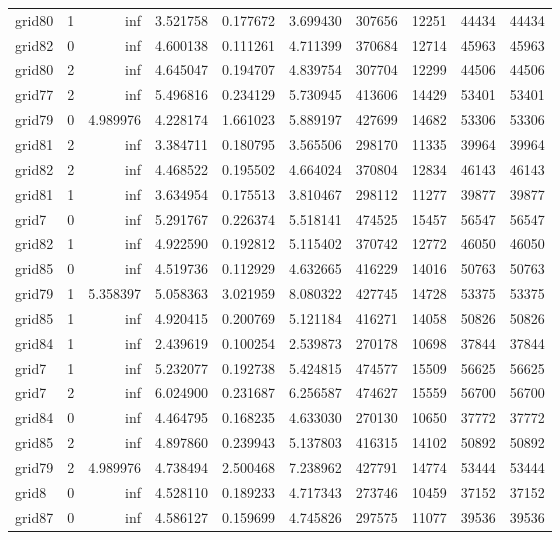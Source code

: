 \begin{longtable}{|l|r|r|r|r|r|r|r|r|r|}
grid80 & 1 & inf & 3.521758 & 0.177672 & 3.699430 & 307656 & 12251 & 44434 & 44434 \\
grid82 & 0 & inf & 4.600138 & 0.111261 & 4.711399 & 370684 & 12714 & 45963 & 45963 \\
grid80 & 2 & inf & 4.645047 & 0.194707 & 4.839754 & 307704 & 12299 & 44506 & 44506 \\
grid77 & 2 & inf & 5.496816 & 0.234129 & 5.730945 & 413606 & 14429 & 53401 & 53401 \\
grid79 & 0 & 4.989976 & 4.228174 & 1.661023 & 5.889197 & 427699 & 14682 & 53306 & 53306 \\
grid81 & 2 & inf & 3.384711 & 0.180795 & 3.565506 & 298170 & 11335 & 39964 & 39964 \\
grid82 & 2 & inf & 4.468522 & 0.195502 & 4.664024 & 370804 & 12834 & 46143 & 46143 \\
grid81 & 1 & inf & 3.634954 & 0.175513 & 3.810467 & 298112 & 11277 & 39877 & 39877 \\
grid7 & 0 & inf & 5.291767 & 0.226374 & 5.518141 & 474525 & 15457 & 56547 & 56547 \\
grid82 & 1 & inf & 4.922590 & 0.192812 & 5.115402 & 370742 & 12772 & 46050 & 46050 \\
grid85 & 0 & inf & 4.519736 & 0.112929 & 4.632665 & 416229 & 14016 & 50763 & 50763 \\
grid79 & 1 & 5.358397 & 5.058363 & 3.021959 & 8.080322 & 427745 & 14728 & 53375 & 53375 \\
grid85 & 1 & inf & 4.920415 & 0.200769 & 5.121184 & 416271 & 14058 & 50826 & 50826 \\
grid84 & 1 & inf & 2.439619 & 0.100254 & 2.539873 & 270178 & 10698 & 37844 & 37844 \\
grid7 & 1 & inf & 5.232077 & 0.192738 & 5.424815 & 474577 & 15509 & 56625 & 56625 \\
grid7 & 2 & inf & 6.024900 & 0.231687 & 6.256587 & 474627 & 15559 & 56700 & 56700 \\
grid84 & 0 & inf & 4.464795 & 0.168235 & 4.633030 & 270130 & 10650 & 37772 & 37772 \\
grid85 & 2 & inf & 4.897860 & 0.239943 & 5.137803 & 416315 & 14102 & 50892 & 50892 \\
grid79 & 2 & 4.989976 & 4.738494 & 2.500468 & 7.238962 & 427791 & 14774 & 53444 & 53444 \\
grid8 & 0 & inf & 4.528110 & 0.189233 & 4.717343 & 273746 & 10459 & 37152 & 37152 \\
grid87 & 0 & inf & 4.586127 & 0.159699 & 4.745826 & 297575 & 11077 & 39536 & 39536 \\

\end{longtable}
